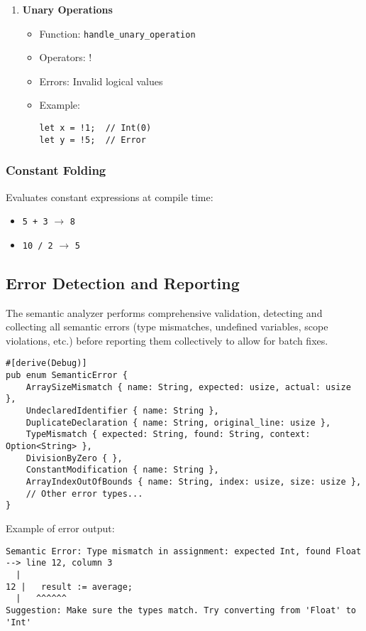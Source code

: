 \documentclass[12pt,a4paper]{article}
\begin{document}
\begin{enumerate}
	\item \textbf{Unary Operations}
	      \begin{itemize}
		      \item Function: \texttt{handle\_unary\_operation}
		      \item Operators: !
		      \item Errors: Invalid logical values
		      \item Example:
		            \begin{lstlisting}
let x = !1;  // Int(0)
let y = !5;  // Error
        \end{lstlisting}
	      \end{itemize}
\end{enumerate}


\subsubsection*{Constant Folding}
Evaluates constant expressions at compile time:
\begin{itemize}
	\item \texttt{5 + 3} $\rightarrow$ \texttt{8}
	\item \texttt{10 / 2} $\rightarrow$ \texttt{5}
\end{itemize}


\subsection{Error Detection and Reporting}
The semantic analyzer performs comprehensive validation, detecting and collecting all semantic errors (type mismatches, undefined variables, scope violations, etc.) before reporting them collectively to allow for batch fixes.
\begin{lstlisting}[caption={Semantic Error Types}]
#[derive(Debug)]
pub enum SemanticError {
    ArraySizeMismatch { name: String, expected: usize, actual: usize },
    UndeclaredIdentifier { name: String },
    DuplicateDeclaration { name: String, original_line: usize },
    TypeMismatch { expected: String, found: String, context: Option<String> },
    DivisionByZero { },
    ConstantModification { name: String },
    ArrayIndexOutOfBounds { name: String, index: usize, size: usize },
    // Other error types...
}
\end{lstlisting}

Example of error output:

\begin{lstlisting}[caption={Semantic Error Output}]
Semantic Error: Type mismatch in assignment: expected Int, found Float
--> line 12, column 3
  |
12 |   result := average;
  |   ^^^^^^
Suggestion: Make sure the types match. Try converting from 'Float' to 'Int'
\end{lstlisting}
\end{document}
